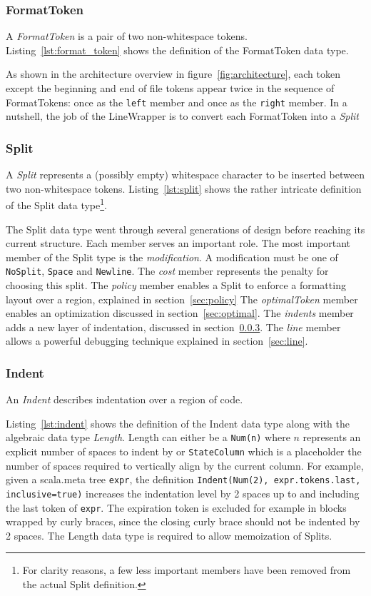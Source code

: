 \subsubsection{FormatToken}
A \emph{FormatToken} is a pair of two non-whitespace tokens.
Listing~\ref{lst:format_token} shows the definition of the FormatToken data type.

As shown in the architecture overview in figure~\ref{fig:architecture}, each token except the beginning and end of file tokens appear twice in the sequence of FormatTokens: once as the \texttt{left} member and once as the \texttt{right} member.
In a nutshell, the job of the LineWrapper is to convert each FormatToken into a \emph{Split}

\subsubsection{Split}
A \emph{Split} represents a (possibly empty) whitespace character to be inserted between two non-whitespace tokens.
Listing~\ref{lst:split} shows the rather intricate definition of the Split data type\footnote{
  For clarity reasons, a few less important members have been removed from the actual Split definition.}.

The Split data type went through several generations of design before reaching its current structure.
Each member serves an important role.
The most important member of the Split type is the \emph{modification}.
A modification must be one of \texttt{NoSplit}, \texttt{Space} and \texttt{Newline}.
The \emph{cost} member represents the penalty for choosing this split.
The \emph{policy} member enables a Split to enforce a formatting layout over a region, explained in section~\ref{sec:policy}
The \emph{optimalToken} member enables an optimization discussed in section~\ref{sec:optimal}.
The \emph{indents} member adds a new layer of indentation, discussed in section~\ref{sec:indent}.
The \emph{line} member allows a powerful debugging technique explained in section~\ref{sec:line}.

\subsubsection{Indent}\label{sec:indent}
An \emph{Indent} describes indentation over a region of code.

Listing~\ref{lst:indent} shows the definition of the Indent data type along with the algebraic data type \emph{Length}.
Length can either be a \texttt{Num(n)} where $n$ represents an explicit number of spaces to indent by or \texttt{StateColumn} which is a placeholder the number of spaces required to vertically align by the current column.
For example, given a scala.meta tree \texttt{expr}, the definition \texttt{Indent(Num(2), expr.tokens.last, inclusive=true)}
increases the indentation level by 2 spaces up to and including the last token of \texttt{expr}.
The expiration token is excluded for example in blocks wrapped by curly braces, since the closing curly brace should not be indented by 2 spaces.
The Length data type is required to allow memoization of Splits.

